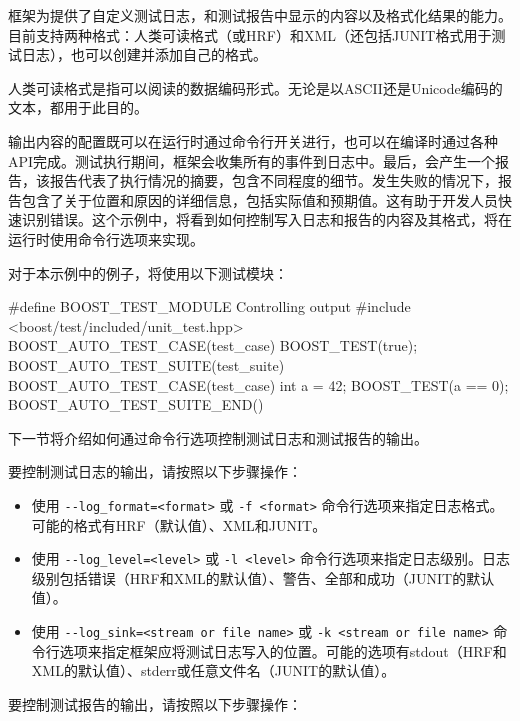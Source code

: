 
框架为提供了自定义测试日志，和测试报告中显示的内容以及格式化结果的能力。目前支持两种格式：人类可读格式（或HRF）和XML（还包括JUNIT格式用于测试日志），也可以创建并添加自己的格式。

\begin{myNotic}
人类可读格式是指可以阅读的数据编码形式。无论是以ASCII还是Unicode编码的文本，都用于此目的。
\end{myNotic}

输出内容的配置既可以在运行时通过命令行开关进行，也可以在编译时通过各种API完成。测试执行期间，框架会收集所有的事件到日志中。最后，会产生一个报告，该报告代表了执行情况的摘要，包含不同程度的细节。发生失败的情况下，报告包含了关于位置和原因的详细信息，包括实际值和预期值。这有助于开发人员快速识别错误。这个示例中，将看到如何控制写入日志和报告的内容及其格式，将在运行时使用命令行选项来实现。


对于本示例中的例子，将使用以下测试模块：

\begin{cpp}
#define BOOST_TEST_MODULE Controlling output
#include <boost/test/included/unit_test.hpp>
BOOST_AUTO_TEST_CASE(test_case)
{
    BOOST_TEST(true);
}
BOOST_AUTO_TEST_SUITE(test_suite)
BOOST_AUTO_TEST_CASE(test_case)
{
    int a = 42;
    BOOST_TEST(a == 0);
}
BOOST_AUTO_TEST_SUITE_END()
\end{cpp}

下一节将介绍如何通过命令行选项控制测试日志和测试报告的输出。


要控制测试日志的输出，请按照以下步骤操作：

\begin{itemize}
\item
使用 \verb|--log_format=<format>| 或 \verb|-f <format>| 命令行选项来指定日志格式。可能的格式有HRF（默认值）、XML和JUNIT。

\item
使用 \verb|--log_level=<level>| 或 \verb|-l <level>| 命令行选项来指定日志级别。日志级别包括错误（HRF和XML的默认值）、警告、全部和成功（JUNIT的默认值）。

\item
使用 \verb|--log_sink=<stream or file name>| 或 \verb|-k <stream or file name>| 命令行选项来指定框架应将测试日志写入的位置。可能的选项有stdout（HRF和XML的默认值）、stderr或任意文件名（JUNIT的默认值）。
\end{itemize}

要控制测试报告的输出，请按照以下步骤操作：

